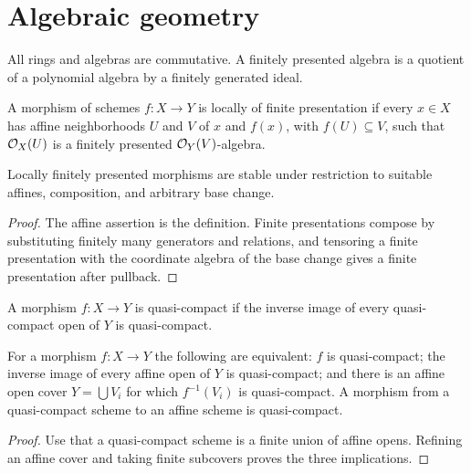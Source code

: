 \section{Algebraic geometry}

All rings and algebras are commutative.  A finitely presented algebra is a
quotient of a polynomial algebra by a finitely generated ideal.

\begin{definition}\label{fga-def-1-1}\uses{}
A morphism of schemes $f:X\to Y$ is locally of finite presentation if every
$x\in X$ has affine neighborhoods $U$ and $V$ of $x$ and $f(x)$, with
$f(U)\subseteq V$, such that $\mathcal O_X(U)$ is a finitely presented
$\mathcal O_Y(V)$-algebra.
\end{definition}\begin{proposition}\label{fga-prop-1-2}
Locally finitely presented morphisms are stable under restriction to suitable
affines, composition, and arbitrary base change.
\end{proposition}
\begin{proof}
The affine assertion is the definition.  Finite presentations compose by
substituting finitely many generators and relations, and tensoring a finite
presentation with the coordinate algebra of the base change gives a finite
presentation after pullback.
\end{proof}

\begin{definition}\label{fga-def-1-3}\uses{}
A morphism $f:X\to Y$ is quasi-compact if the inverse image of every
quasi-compact open of $Y$ is quasi-compact.
\end{definition}\begin{proposition}\label{fga-prop-1-4}
For a morphism $f:X\to Y$ the following are equivalent: $f$ is
quasi-compact; the inverse image of every affine open of $Y$ is
quasi-compact; and there is an affine open cover $Y=\bigcup V_i$ for which
$f^{-1}(V_i)$ is quasi-compact.  A morphism from a quasi-compact scheme to an
affine scheme is quasi-compact.
\end{proposition}
\begin{proof}
Use that a quasi-compact scheme is a finite union of affine opens.  Refining
an affine cover and taking finite subcovers proves the three implications.
\end{proof}

